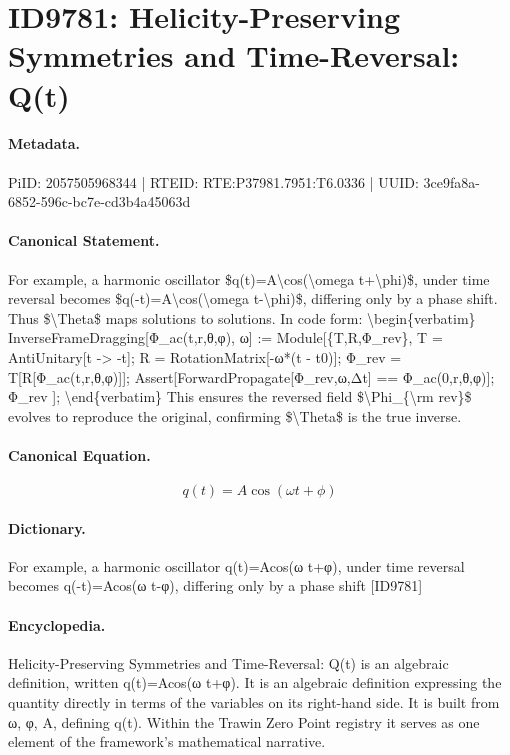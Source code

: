 \section*{ID9781: Helicity-Preserving Symmetries and Time-Reversal: Q(t)}
\paragraph{Metadata.}
PiID: 2057505968344 | RTEID: RTE:P37981.7951:T6.0336 | UUID: 3ce9fa8a-6852-596c-bc7e-cd3b4a45063d

\paragraph{Canonical Statement.}
For example, a harmonic oscillator \$q(t)=A\textbackslash{}cos(\textbackslash{}omega t+\textbackslash{}phi)\$, under time reversal becomes \$q(-t)=A\textbackslash{}cos(\textbackslash{}omega t-\textbackslash{}phi)\$, differing only by a phase shift. Thus \$\textbackslash{}Theta\$ maps solutions to solutions. In code form: \textbackslash{}begin\{verbatim\} InverseFrameDragging[Φ\_ac(t,r,θ,φ), ω] := Module[\{T,R,Φ\_rev\}, T = AntiUnitary[t -> -t]; R = RotationMatrix[-ω*(t - t0)]; Φ\_rev = T[R[Φ\_ac(t,r,θ,φ)]]; Assert[ForwardPropagate[Φ\_rev,ω,Δt] == Φ\_ac(0,r,θ,φ)]; Φ\_rev ]; \textbackslash{}end\{verbatim\} This ensures the reversed field \$\textbackslash{}Phi\_\{\textbackslash{}rm rev\}\$ evolves to reproduce the original, confirming \$\textbackslash{}Theta\$ is the true inverse.

\paragraph{Canonical Equation.}
\[
q(t)=A\cos(\omega t+\phi)
\]

\paragraph{Dictionary.}
For example, a harmonic oscillator q(t)=Acos(ω t+φ), under time reversal becomes q(-t)=Acos(ω t-φ), differing only by a phase shift [ID9781]

\paragraph{Encyclopedia.}
Helicity-Preserving Symmetries and Time-Reversal: Q(t) is an algebraic definition, written q(t)=Acos(ω t+φ). It is an algebraic definition expressing the quantity directly in terms of the variables on its right-hand side. It is built from ω, φ, A, defining q(t). Within the Trawin Zero Point registry it serves as one element of the framework's mathematical narrative.

